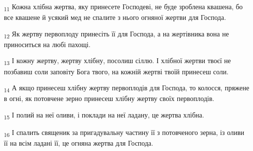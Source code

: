 \begin{tcolorbox}
\textsubscript{11} Кожна хлібна жертва, яку принесете Господеві, не буде зроблена квашена, бо все квашене й усякий мед не спалите з нього огняної жертви для Господа.
\end{tcolorbox}
\begin{tcolorbox}
\textsubscript{12} Як жертву первоплоду принесіть її для Господа, а на жертівника вона не приноситься на любі пахощі.
\end{tcolorbox}
\begin{tcolorbox}
\textsubscript{13} І кожну жертву, жертву хлібну, посолиш сіллю. І хлібної жертви твоєї не позбавиш соли заповіту Бога твого, на кожній жертві твоїй принесеш соли.
\end{tcolorbox}
\begin{tcolorbox}
\textsubscript{14} А якщо принесеш хлібну жертву первоплодів для Господа, то колосся, пряжене в огні, як потовчене зерно принесеш хлібну жертву своїх первоплодів.
\end{tcolorbox}
\begin{tcolorbox}
\textsubscript{15} І полий на неї оливи, і поклади на неї ладану, це жертва хлібна.
\end{tcolorbox}
\begin{tcolorbox}
\textsubscript{16} І спалить священик за пригадувальну частину її з потовченого зерна, із оливи її на всім ладані її, це огняна жертва для Господа.
\end{tcolorbox}
